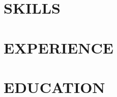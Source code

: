\documentclass[letter,10pt]{article}
\begin{document}


\section{SKILLS}


\section{EXPERIENCE}


\section{EDUCATION}



% 
\end{document}
